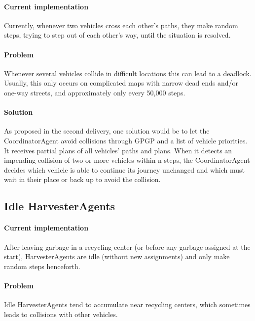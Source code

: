 \paragraph{Current implementation}

Currently, whenever two vehicles cross each other's paths, they make random steps, trying to step out of each other's way, until the situation is resolved.

\paragraph{Problem}

Whenever several vehicles collide in difficult locations this can lead to a deadlock. Usually, this only occurs on complicated maps with narrow dead ends and/or one-way streets, and approximately only every 50,000 steps.

\paragraph{Solution}

As proposed in the second delivery, one solution would be to let the CoordinatorAgent avoid collisions through GPGP and a list of vehicle priorities. It receives partial plans of all vehicles' paths and plans. When it detects an impending collision of two or more vehicles within n steps, the CoordinatorAgent decides which vehicle is able to continue its journey unchanged and which must wait in their place or back up to avoid the collision.


\subsection{Idle HarvesterAgents}

\paragraph{Current implementation}

After leaving garbage in a recycling center (or before any garbage assigned at the start), HarvesterAgents are idle (without new assignments) and only make random steps henceforth.

\paragraph{Problem}

Idle HarvesterAgents tend to accumulate near recycling centers, which sometimes leads to collisions with other vehicles.

